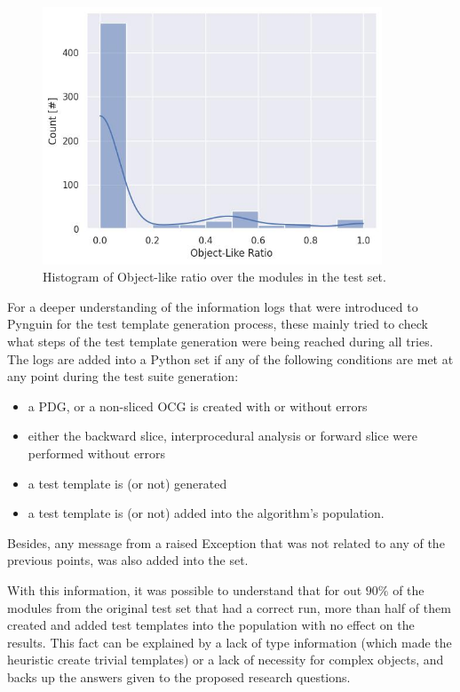 \documentclass[%
  chapterprefix=false,%
  open=right,%
  twoside=true,%
  paper=a4,%
  logofile={Figures/logo.png},%
  thesistype=master,%
  UKenglish,%
]{se2thesis}
\begin{document}
\begin{figure}[bth]
  \centering
  \includegraphics[width=0.9\textwidth]{Figures/Results/olr-hist.jpg}
  \caption{Histogram of Object-like ratio over the modules in the test set.}\label{fig:olr-hist}
\end{figure}

For a deeper understanding of the information logs that were introduced to Pynguin for the test template generation process, these mainly tried to check what steps of the test template generation were being reached during all tries.
The logs are added into a Python set if any of the following conditions are met at any point during the test suite generation:
\begin{itemize}
  \item a PDG, or a non-sliced OCG is created with or without errors
  \item either the backward slice, interprocedural analysis or forward slice were performed without errors
  \item a test template is (or not) generated
  \item a test template is (or not) added into the algorithm's population.
\end{itemize}
Besides, any message from a raised Exception that was not related to any of the previous points, was also added into the set.

With this information, it was possible to understand that for out \(90\%\) of the modules from the original test set that had a correct run, more than half of them created and added test templates into the population with no effect on the results. 
This fact can be explained by a lack of type information (which made the heuristic create trivial templates) or a lack of necessity for complex objects, and backs up the answers given to the proposed research questions.
\end{document}
